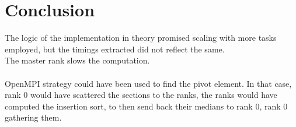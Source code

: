\documentclass[11pt]{article}
\begin{document}
\section{Conclusion}

The logic of the implementation in theory promised scaling with more tasks employed, but the timings extracted did not reflect the same.\\
The master rank slows the computation. 
\\\\
OpenMPI strategy could have been used to find the pivot element. In that case, rank 0 would have scattered the sections to the ranks, the ranks would have computed the insertion sort, to then send back their medians to rank 0, rank 0 gathering them.
\end{document}
